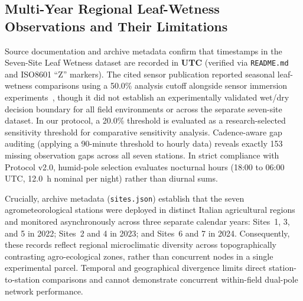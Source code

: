 \documentclass[10pt,twocolumn,a4paper]{article}
\begin{document}
\subsection{Multi-Year Regional Leaf-Wetness Observations and Their Limitations}
Source documentation and archive metadata confirm that timestamps in the Seven-Site Leaf Wetness dataset are recorded in \textbf{UTC} (verified via \texttt{README.md} and ISO8601 ``Z'' markers). The cited sensor publication reported seasonal leaf-wetness comparisons using a 50.0\% analysis cutoff alongside sensor immersion experiments~\cite{filipescu2024}, though it did not establish an experimentally validated wet/dry decision boundary for all field environments or across the separate seven-site dataset. In our protocol, a 20.0\% threshold is evaluated as a research-selected sensitivity threshold for comparative sensitivity analysis. Cadence-aware gap auditing (applying a 90-minute threshold to hourly data) reveals exactly 153 missing observation gaps across all seven stations. In strict compliance with Protocol v2.0, humid-pole selection evaluates nocturnal hours (18:00 to 06:00 UTC, 12.0~h nominal per night) rather than diurnal sums.

Crucially, archive metadata (\texttt{sites.json}) establish that the seven agrometeorological stations were deployed in distinct Italian agricultural regions and monitored asynchronously across three separate calendar years: Sites~1, 3, and 5 in 2022; Sites~2 and 4 in 2023; and Sites~6 and 7 in 2024. Consequently, these records reflect regional microclimatic diversity across topographically contrasting agro-ecological zones, rather than concurrent nodes in a single experimental parcel. Temporal and geographical divergence limits direct station-to-station comparisons and cannot demonstrate concurrent within-field dual-pole network performance.
\end{document}
